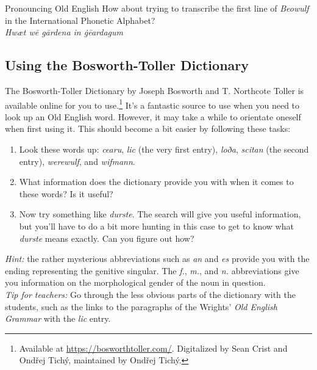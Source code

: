 \begin{exercises}{Pronouncing Old English}\label{exercise-OE-pronounce}
How about trying to transcribe the first line of \textit{Beowulf} in the International Phonetic Alphabet?\\

\textit{Hwæt wē gārdena in ġēardagum}\\


\subsection{Using the Bosworth-Toller Dictionary}
The Bosworth-Toller Dictionary by Joseph Bosworth and T. Northcote Toller is available online for you to use.\footnote{Available at \url{https://bosworthtoller.com/}. Digitalized by Sean Crist and Ond\v{r}ej Tich\'{y}, maintained by Ond\v{r}ej Tich\'{y}.} It's a fantastic source to use when you need to look up an Old English word. However, it may take a while to orientate oneself when first using it. This should become a bit easier by following these tasks:

\begin{enumerate}
  \item Look these words up: \textit{cearu}, \textit{lic} (the very first entry), \textit{loða}, \textit{scitan} (the second entry), \textit{werewulf}, and \textit{wifmann}.
  \item What information does the dictionary provide you with when it comes to these words? Is it useful?
  \item Now try something like \textit{durste}. The search will give you useful information, but you'll have to do a bit more hunting in this case to get to know what \textit{durste} means exactly. Can you figure out how?
\end{enumerate}

\noindent\emph{Hint:} the rather mysterious abbreviations such as \textit{an} and \textit{es} provide you with the ending representing the genitive singular. The \textit{f.}, \textit{m.}, and \textit{n.} abbreviations give you information on the morphological gender of the noun in question.\\

\noindent\emph{Tip for teachers:} Go through the less obvious parts of the dictionary with the students, such as the links to the paragraphs of the Wrights' \textit{Old English Grammar} with the \textit{lic} entry.

\end{exercises}

